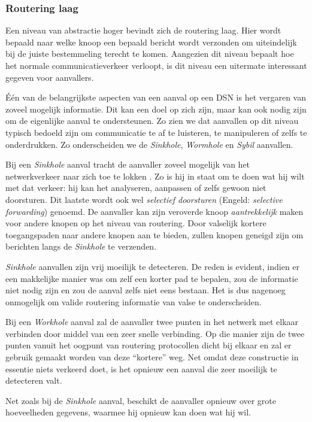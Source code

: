 \subsubsection*{Routering laag}

Een niveau van abstractie hoger bevindt zich de routering laag. Hier wordt
bepaald naar welke knoop een bepaald bericht wordt verzonden om uiteindelijk
bij de juiste bestemmeling terecht te komen. Aangezien dit niveau bepaalt hoe
het normale communicatieverkeer verloopt, is dit niveau een uitermate
interessant gegeven voor aanvallers.

\'E\'en van de belangrijkste aspecten van een aanval op een DSN is het vergaren
van zoveel mogelijk informatie. Dit kan een doel op zich zijn, maar kan ook
nodig zijn om de eigenlijke aanval te ondersteunen. Zo zien we dat aanvallen op
dit niveau typisch bedoeld zijn om communicatie te af te luisteren, te
manipuleren of zelfs te onderdrukken. Zo onderscheiden we de \emph{Sinkhole},
\emph{Wormhole} en \emph{Sybil} aanvallen.

Bij een \emph{Sinkhole} aanval tracht de aanvaller zoveel mogelijk van het
netwerkverkeer naar zich toe te lokken \citep{krontiris2008launching}. Zo is hij
in staat om te doen wat hij wilt met dat verkeer: hij kan het analyseren,
aanpassen of zelfs gewoon niet doorsturen. Dit laatste wordt ook wel
\emph{selectief doorsturen} (Engeld: \emph{selective forwarding}) genoemd. De
aanvaller kan zijn veroverde knoop \emph{aantrekkelijk} maken voor andere
knopen op het niveau van routering. Door valselijk kortere toegangspaden naar
andere knopen aan te bieden, zullen knopen geneigd zijn om berichten langs de
\emph{Sinkhole} te verzenden.

\emph{Sinkhole} aanvallen zijn vrij moeilijk te detecteren. De reden is
evident, indien er een makkelijke manier was om zelf een korter pad te bepalen,
zou de informatie niet nodig zijn en zou de aanval zelfs niet eens bestaan. Het
is dus nagenoeg onmogelijk om valide routering informatie van valse te
onderscheiden.

Bij een \emph{Workhole} aanval zal de aanvaller twee punten in het netwerk met
elkaar verbinden door middel van een zeer snelle verbinding. Op die manier zijn
de twee punten vanuit het oogpunt van routering protocollen dicht bij elkaar en
zal er gebruik gemaakt worden van deze ``kortere'' weg. Net omdat deze
constructie in essentie niets verkeerd doet, is het opnieuw een aanval die zeer
moeilijk te detecteren valt.

Net zoals bij de \emph{Sinkhole} aanval, beschikt de aanvaller opnieuw over
grote hoeveelheden gegevens, waarmee hij opnieuw kan doen wat hij wil.

